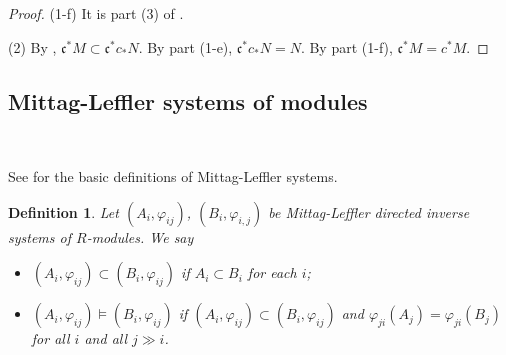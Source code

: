 \documentclass[11pt]{amsart}
\newtheorem{dfn}{Definition}
\numberwithin{thm}{section}
\numberwithin{lem}{section}
\numberwithin{cor}{section}
\numberwithin{prop}{section}
\numberwithin{exam}{section}
\numberwithin{dfn}{section}
\newcommand{\Coh}{\operatorname{Coh}}
\newcommand{\spec}{\operatorname{Spec}}
\newcommand{\mysection}{\subsection}
\newcommand{\mysubsection}{\subsubsection}
\newcommand{\fc}{\mathfrak{c}}
\begin{document}
\begin{appendices}
\begin{proof}
(1-f) It is part (3) of \cite[Tag 00MA]{Stacks}.

(2)
By \cite[Tag 0315]{Stacks}, $\fc^* M \subset \fc^*c_*N$.
By part (1-e), $\fc^*c_*N=N$.
By part (1-f), $\fc^*M=c^*M$.
\end{proof}


%

\mysection{Mittag-Leffler systems of modules}~

See \cite[Tag 0594]{Stacks} for the basic definitions of Mittag-Leffler systems.

\begin{dfn}
Let $(A_i, \varphi_{ij})$, $(B_i, \varphi_{i,j})$
be Mittag-Leffler directed inverse systems of $R$-modules.
We say
\begin{itemize}
\item $(A_i, \varphi_{ij}) \subset (B_i, \varphi_{ij})$
if $A_i\subset B_i$ for each $i$;
\item $(A_i, \varphi_{ij}) \models (B_i, \varphi_{ij})$
if $(A_i, \varphi_{ij}) \subset (B_i, \varphi_{ij})$
and $\varphi_{ji}(A_j)=\varphi_{ji}(B_j)$ for all $i$
and all $j\gg i$.
\end{itemize}
\end{dfn}


\end{appendices}
\end{document}
